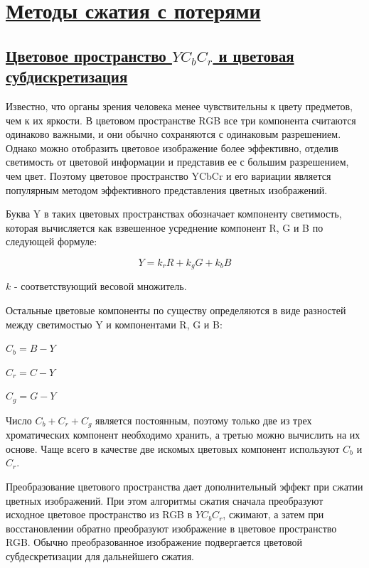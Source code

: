 \section*{\hyperlink{toc}{Методы сжатия с потерями}}

\subsection*{\hyperlink{toc}{Цветовое пространство $YC_bC_r$ и цветовая субдискретизация}}

Известно, что органы зрения человека менее чувствительны к цвету предметов, чем к их яркости. В цветовом пространстве RGB все три компонента считаются одинаково важными, и они обычно сохраняются с одинаковым разрешением. Однако можно отобразить цветовое изображение более эффективно, отделив светимость от цветовой информации и представив ее с большим разрешением, чем цвет. Поэтому цветовое пространство YCbCr и его вариации является популярным методом эффективного представления цветных изображений. 

Буква Y в таких цветовых пространствах обозначает компоненту светимость, которая вычисляется как взвешенное усреднение компонент R, G и B по следующей формуле: 

\begin{displaymath}
	Y = k_rR + k_gG + k_bB
\end{displaymath}

$k$ - соответствующий весовой множитель.

Остальные цветовые компоненты по существу определяются в виде разностей между светимостью Y и компонентами R, G и B: 

\begin{center}
	$C_b = B - Y$ 

	$C_r = C - Y$ 

	$C_g = G - Y$ 
\end{center}


Число $C_b+C_r+C_g$ является постоянным, поэтому только две из трех хроматических компонент необходимо хранить, а третью можно вычислить на их основе. Чаще всего в качестве две искомых цветовых компонент используют $C_b$ и $C_r$. 


Преобразование цветового пространства дает дополнительный эффект при сжатии цветных изображений. При этом алгоритмы сжатия сначала преобразуют исходное цветовое пространство из RGB в $YC_bC_r$, сжимают, а затем при восстановлении обратно преобразуют изображение в цветовое пространство RGB. Обычно преобразованное изображение подвергается цветовой субдескретизации для дальнейшего сжатия.


